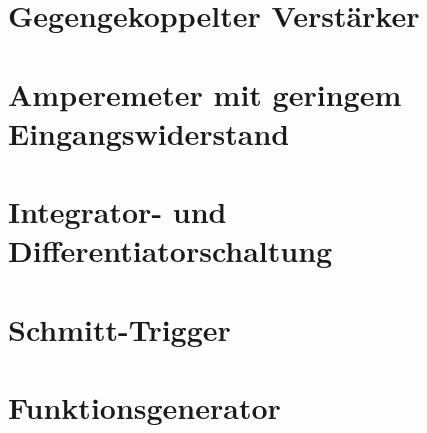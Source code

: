 \section{Gegengekoppelter Verstärker}






\section{Amperemeter mit geringem Eingangswiderstand}

\section{Integrator- und Differentiatorschaltung}

\section{Schmitt-Trigger}

\section{Funktionsgenerator}


